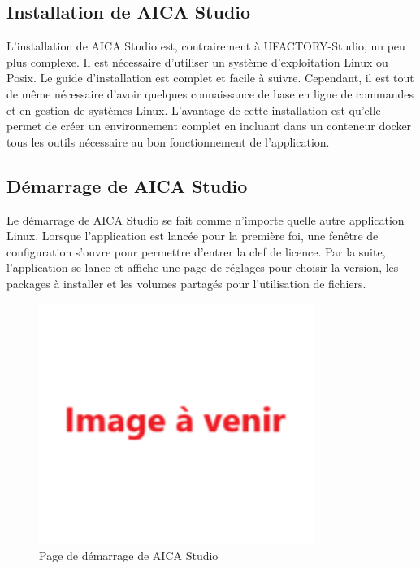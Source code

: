 \subsection{Installation de AICA Studio}
L'installation de AICA Studio est, contrairement à UFACTORY-Studio, un peu plus complexe. Il est nécessaire d'utiliser un système d'exploitation Linux ou Posix. Le guide d'installation \cite{AICADocs} est complet et facile à suivre. Cependant, il est tout de même nécessaire d'avoir quelques connaissance de base en ligne de commandes et en gestion de systèmes Linux. L'avantage de cette installation est qu'elle permet de créer un environnement complet en incluant dans un \gls{conteneur} \gls{docker} tous les outils nécessaire au bon fonctionnement de l'application.

\subsection{Démarrage de AICA Studio}
Le démarrage de AICA Studio se fait comme n'importe quelle autre application Linux. Lorsque l'application est lancée pour la première foi, une fenêtre de configuration s'ouvre pour permettre d'entrer la clef de licence. Par la suite, l'application se lance et affiche une page de réglages pour choisir la version, les packages à installer et les volumes partagés pour l'utilisation de fichiers.

\begin{figure}[H]
    \centering
    \includegraphics[width=0.8\textwidth]{assets/figures/img_a_venir.png}
    \caption{Page de démarrage de AICA Studio}
    \label{fig:aica_startup}
\end{figure}

